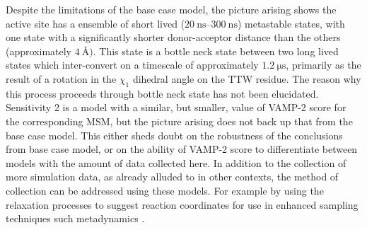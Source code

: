 Despite the limitations of the base case model, the picture arising shows the active site has a ensemble of short lived ($\SIrange{20}{300}{\nano\second}$) metastable states, with one state with a significantly shorter donor-acceptor distance than the others (approximately $\SI{4}{\angstrom})$. This state is a bottle neck state between two long lived states which inter-convert on a timescale of approximately $\SI{1.2}{\micro\second}$, primarily as the result of a rotation in the $\chi_1$ dihedral angle on the TTW residue. The reason why this process proceeds through bottle neck state has not been elucidated. Sensitivity 2 is a model with a similar, but smaller, value of VAMP-2 score for the corresponding MSM, but the picture arising does not back up that from the base case model. This either sheds doubt on the robustness of the conclusions from base case model, or on the ability of VAMP-2 score to differentiate between models with the amount of data collected here. In addition to the collection of more simulation data, as already alluded to in other contexts, the method of collection can be addressed using these models. For example by using the relaxation processes to suggest reaction coordinates for use in enhanced sampling techniques such metadynamics \cite{laioEscapingFreeenergyMinima2002}. 











